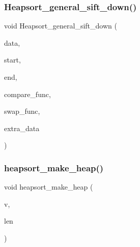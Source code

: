 \subsubsection{\texorpdfstring{Heapsort\+\_\+general\+\_\+sift\+\_\+down()}{Heapsort\_general\_sift\_down()}}
{\footnotesize\ttfamily void Heapsort\+\_\+general\+\_\+sift\+\_\+down (\begin{DoxyParamCaption}\item[{void $\ast$}]{data,  }\item[{\mbox{\hyperlink{galois_8h_a09fddde158a3a20bd2dcadb609de11dc}{I\+NT}}}]{start,  }\item[{\mbox{\hyperlink{galois_8h_a09fddde158a3a20bd2dcadb609de11dc}{I\+NT}}}]{end,  }\item[{\mbox{\hyperlink{galois_8h_a09fddde158a3a20bd2dcadb609de11dc}{I\+NT}}($\ast$)(void $\ast$data, \mbox{\hyperlink{galois_8h_a09fddde158a3a20bd2dcadb609de11dc}{I\+NT}} \mbox{\hyperlink{alphabet2_8_c_acb559820d9ca11295b4500f179ef6392}{i}}, \mbox{\hyperlink{galois_8h_a09fddde158a3a20bd2dcadb609de11dc}{I\+NT}} \mbox{\hyperlink{alphabet2_8_c_a37d972ae0b47b9099e30983131d31916}{j}}, void $\ast$extra\+\_\+data)}]{compare\+\_\+func,  }\item[{void($\ast$)(void $\ast$data, \mbox{\hyperlink{galois_8h_a09fddde158a3a20bd2dcadb609de11dc}{I\+NT}} \mbox{\hyperlink{alphabet2_8_c_acb559820d9ca11295b4500f179ef6392}{i}}, \mbox{\hyperlink{galois_8h_a09fddde158a3a20bd2dcadb609de11dc}{I\+NT}} \mbox{\hyperlink{alphabet2_8_c_a37d972ae0b47b9099e30983131d31916}{j}}, void $\ast$extra\+\_\+data)}]{swap\+\_\+func,  }\item[{void $\ast$}]{extra\+\_\+data }\end{DoxyParamCaption})}

\mbox{\label{sorting_8_c_a42f24453d7d77eeb1338ebd1a13cfdbb}} 
\subsubsection{\texorpdfstring{heapsort\+\_\+make\+\_\+heap()}{heapsort\_make\_heap()}}
{\footnotesize\ttfamily void heapsort\+\_\+make\+\_\+heap (\begin{DoxyParamCaption}\item[{\mbox{\hyperlink{galois_8h_a09fddde158a3a20bd2dcadb609de11dc}{I\+NT}} $\ast$}]{v,  }\item[{\mbox{\hyperlink{galois_8h_a09fddde158a3a20bd2dcadb609de11dc}{I\+NT}}}]{len }\end{DoxyParamCaption})}

